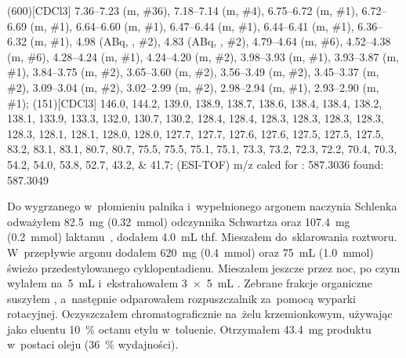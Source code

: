 \begin{fullexp}
	\NMR(600)[CDCl3] \numrange{7.36}{7.23} (m, \#{36}), \numrange{7.18}{7.14} (m, \#{4}), \numrange{6.75}{6.72} (m, \#{1}), \numrange{6.72}{6.69} (m, \#{1}), \numrange{6.64}{6.60} (m, \#{1}), \numrange{6.47}{6.44} (m, \#{1}), \numrange{6.44}{6.41} (m, \#{1}), \numrange{6.36}{6.32} (m, \#{1}), \num{4.98} (ABq, , \#{2}), \num{4.83} (ABq, , \#{2}), \numrange{4.79}{4.64} (m, \#{6}), \numrange{4.52}{4.38} (m, \#{6}), \numrange{4.28}{4.24} (m, \#{1}), \numrange{4.24}{4.20} (m, \#{2}), \numrange{3.98}{3.93} (m, \#{1}), \numrange{3.93}{3.87} (m, \#{1}), \numrange{3.84}{3.75} (m, \#{2}), \numrange{3.65}{3.60} (m, \#{2}), \numrange{3.56}{3.49} (m, \#{2}), \numrange{3.45}{3.37} (m, \#{2}), \numrange{3.09}{3.04} (m, \#{2}), \numrange{3.02}{2.99} (m, \#{2}), \numrange{2.98}{2.94} (m, \#{1}), \numrange{2.93}{2.90} (m, \#{1}); 
	(151)[CDCl3] \numlist{146.0; 144.2; 139.0; 138.9; 138.7; 138.6; 138.4; 138.4; 138.2; 138.1; 133.9; 133.3; 132.0; 130.7; 130.2; 128.4; 128.4; 128.3; 128.3; 128.3; 128.3; 128.3; 128.1; 128.1; 128.0; 128.0; 127.7; 127.7; 127.6; 127.6; 127.5; 127.5; 127.5; 83.2; 83.1; 83.1; 80.7; 80.7; 75.5; 75.5; 75.1; 75.1; 73.3; 73.2; 72.3; 72.2; 70.4; 70.3; 54.2; 54.0; 53.8; 52.7; 43.2; 41.7}; 
	 (ESI-TOF) m/z calcd for : \num{587.3036} found: \num{587.3049}
\end{fullexp}

Do wygrzanego w~płomieniu palnika i~wypełnionego argonem naczynia Schlenka odważyłem
  \SI{82.5}{\mg} (\SI{0.32}{\mmol}) odczynnika Schwartza oraz \SI{107.4}{\mg} (\SI{0.2}{\mmol})
  laktamu~, dodałem \SI{4.0}{\mL} \gls{thf}.
Mieszałem do~sklarowania roztworu.
W~przepływie argonu dodałem \SI{620}{\mg} (\SI{0.4}{\mmol})  oraz
  \SI{75}{\mL} (\SI{1.0}{\mmol}) świeżo przedestylowanego cyklopentadienu.
Mieszałem jeszcze przez noc, po czym wylałem na~\SI{5}{\mL}  i~ekstrahowałem
  \SI[product-units = single]{3 x 5}{\mL} .
Zebrane frakcje organiczne suszyłem , a~następnie odparowałem rozpuszczalnik za~pomocą
  wyparki rotacyjnej.
Oczyszczałem chromatograficznie na~żelu krzemionkowym, używając jako eluentu \SI{10}{\percent}
  octanu etylu w~toluenie.
Otrzymałem \SI{43.4}{\mg} produktu w~postaci oleju (\SI{36}{\percent} wydajności).

